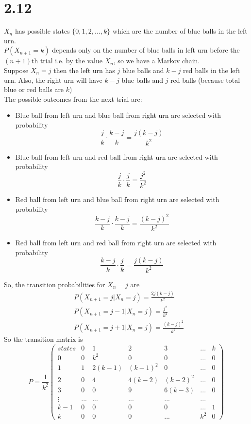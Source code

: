 \documentclass{article}
\begin{document}
\section{2.12}
$X_n$ has possible states $\{0,1,2,...,k\}$ which are the number of blue balls in the left urn.\\
$P(X_{n+1} = k)$ depends only on the number of blue balls in left urn before the $(n+1)$th trial i.e. by the value $X_n$, so we have a Markov chain.\\
Suppose $X_n=j$ then the left urn has $j$ blue balls and $k-j$ red balls in the left urn. Also, the right urn will have $k-j$ blue balls and $j$ red balls (because total blue or red balls are $k$)\\
The possible outcomes from the next trial are:
\begin{itemize}
    \item Blue ball from left urn and blue ball from right urn are selected with probability
    \begin{equation*}
        \frac{j}{k}\cdot\frac{k-j}{k}=\frac{j(k-j)}{k^2}
    \end{equation*}
    \item Blue ball from left urn and red ball from right urn are selected with probability
    \begin{equation*}
        \frac{j}{k}\cdot\frac{j}{k}=\frac{j^2}{k^2}
    \end{equation*}
    \item Red ball from left urn and blue ball from right urn are selected with probability
    \begin{equation*}
        \frac{k-j}{k}\cdot\frac{k-j}{k}=\frac{(k-j)^2}{k^2}
    \end{equation*}
    \item Red ball from left urn and red ball from right urn are selected with probability
    \begin{equation*}
        \frac{k-j}{k}\cdot\frac{j}{k}=\frac{j(k-j)}{k^2}
    \end{equation*}
\end{itemize}
So, the transition probabilities for $X_n=j$ are
\begin{align*}
    &P(X_{n+1}=j|X_n=j)=\frac{2j(k-j)}{k^2}\\
    &P(X_{n+1}=j-1|X_n=j)=\frac{j^2}{k^2} \\
    &P(X_{n+1}=j+1|X_n=j)=\frac{(k-j)^2}{k^2}
\end{align*}
So the transition matrix is
\begin{equation*}
    P= \frac{1}{k^2}
    \begin{pmatrix}
    states&0&1&2&3&...&k\\
    0&0&k^2&0&0&...&0\\
    1&1&2(k-1)&(k-1)^2&0&...&0\\
    2&0&4&4(k-2)&(k-2)^2&...&0\\
    3&0&0&9&6(k-3)&...&0\\
    \vdots&...&...&...&...&...\\
    k-1&0&0&0&0&...&1\\
    k&0&0&0&...&k^2&0
    \end{pmatrix}
\end{equation*}
\end{document}

